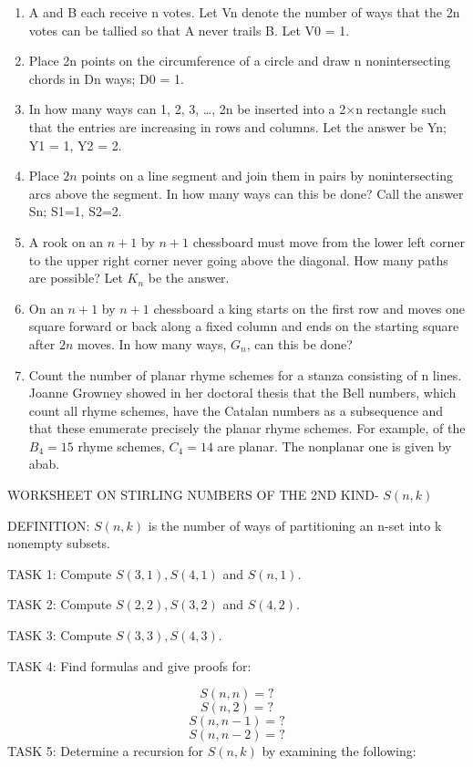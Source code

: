 \documentclass{article}
\begin{document}
\begin{enumerate}
\item A and B each receive n votes. Let Vn denote the number of ways that the 2n votes can be tallied so that A never
trails B. Let V0 = 1. 
\item Place 2n points on the circumference of a circle and draw n nonintersecting chords in Dn ways; D0 = 1.
\item In how many ways can 1, 2, 3, …, 2n be inserted into a 2×n rectangle such that the entries are increasing in rows
and columns. Let the answer be Yn; Y1 = 1, Y2 = 2. 
\item Place  $2n$ points on a line segment and join them in pairs by nonintersecting arcs above the segment. In how many
ways can this be done? Call the answer Sn; S1=1, S2=2.
\item A rook on an  $n+1$ by  $n+1$ chessboard must move from the lower left corner to the upper right corner never
going above the diagonal. How many paths are possible? Let  $K_n$ be the answer. 
\item On an  $n+1$ by  $n+1$ chessboard a king  starts on the first row and moves one square forward or back along a
fixed column and ends on the starting square after  $2n$ moves. In how many ways,  $G_n$, can this be done? 
\item Count the number of planar rhyme schemes for a stanza consisting of n lines. Joanne Growney showed in her doctoral
thesis that the Bell numbers, which count all rhyme schemes, have the Catalan numbers as a subsequence and that these
enumerate precisely the planar rhyme schemes. For example, of the  $B_4=15$ rhyme schemes,  $C_4=14$ are planar. The
nonplanar one is given by abab. 
\end{enumerate}
WORKSHEET ON STIRLING NUMBERS OF THE 2ND KIND- $S(n,k)$

DEFINITION:  $S\left(n,k\right)$ is the number of ways of partitioning an n-set into k nonempty subsets. 

TASK 1: Compute  $S\left(3,1\right),S(4,1)$ and  $S(n,1)$. 

TASK 2: Compute  $S\left(2,2\right),S(3,2)$ and  $S(4,2)$.

TASK 3: Compute $S\left(3,3\right),S(4,3)$. 

TASK 4: Find formulas and give proofs for: 

\begin{equation*}
S\left(n,n\right)=?
\end{equation*}
\begin{equation*}
S\left(n,2\right)=?
\end{equation*}
\begin{equation*}
S\left(n,n-1\right)=?
\end{equation*}
\begin{equation*}
S\left(n,n-2\right)=?
\end{equation*}
TASK 5: Determine a recursion for  $S\left(n,k\right)$ by examining the following:
\end{document}
